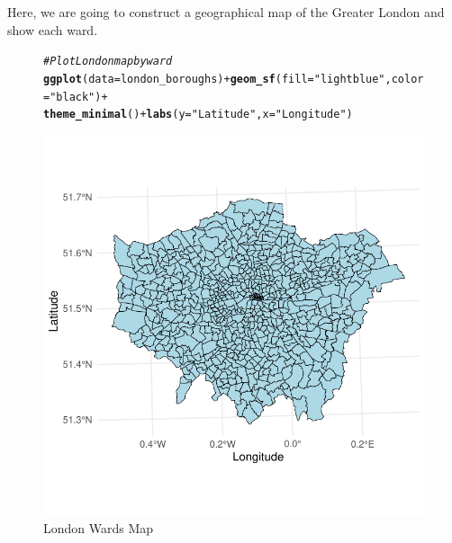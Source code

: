 \documentclass{article}\usepackage[]{graphicx}\usepackage[]{xcolor}
\makeatletter
\def\maxwidth{ %
  \ifdim\Gin@nat@width>\linewidth
    \linewidth
  \else
    \Gin@nat@width
  \fi
}
\newcommand{\hlstr}[1]{\textcolor[rgb]{0.192,0.494,0.8}{#1}}%
\newcommand{\hlcom}[1]{\textcolor[rgb]{0.678,0.584,0.686}{\textit{#1}}}%
\newcommand{\hlopt}[1]{\textcolor[rgb]{0,0,0}{#1}}%
\newcommand{\hlstd}[1]{\textcolor[rgb]{0.345,0.345,0.345}{#1}}%
\newcommand{\hlkwc}[1]{\textcolor[rgb]{0.333,0.667,0.333}{#1}}%
\newcommand{\hlkwd}[1]{\textcolor[rgb]{0.737,0.353,0.396}{\textbf{#1}}}%
\newenvironment{kframe}{%
 \def\at@end@of@kframe{}%
 \ifinner\ifhmode%
  \def\at@end@of@kframe{\end{minipage}}%
  \begin{minipage}{\columnwidth}%
 \fi\fi%
 \def\FrameCommand##1{\hskip\@totalleftmargin \hskip-\fboxsep
 \colorbox{shadecolor}{##1}\hskip-\fboxsep
     \hskip-\linewidth \hskip-\@totalleftmargin \hskip\columnwidth}%
 \MakeFramed {\advance\hsize-\width
   \@totalleftmargin\z@ \linewidth\hsize
   \@setminipage}}%
 {\par\unskip\endMakeFramed%
 \at@end@of@kframe}
\newenvironment{knitrout}{}{} %
\makeatother
\begin{document}
\noindent
Here, we are going to construct a geographical map of the Greater London and show each ward. 

\begingroup
\setlength{\intextsep}{5pt plus 2pt minus 2pt}
\setlength{\textfloatsep}{5pt plus 2pt minus 2pt}
\setlength{\abovecaptionskip}{2pt plus 1pt minus 1pt}
\setlength{\belowcaptionskip}{2pt plus 1pt minus 1pt}

\begin{figure}[H]
\begin{knitrout}\scriptsize
{}\color{fgcolor}\begin{kframe}
\begin{alltt}
\hlcom{# Plot London map by ward}
\hlkwd{ggplot}\hlstd{(}\hlkwc{data} \hlstd{= london_boroughs)} \hlopt{+} \hlkwd{geom_sf}\hlstd{(}\hlkwc{fill} \hlstd{=} \hlstr{"lightblue"}\hlstd{,} \hlkwc{color} \hlstd{=} \hlstr{"black"}\hlstd{)} \hlopt{+}
  \hlkwd{theme_minimal}\hlstd{()} \hlopt{+} \hlkwd{labs}\hlstd{(}\hlkwc{y}\hlstd{=}\hlstr{"Latitude"}\hlstd{,} \hlkwc{x}\hlstd{=}\hlstr{"Longitude"}\hlstd{)}
\end{alltt}
\end{kframe}

{\centering \includegraphics[width=\maxwidth]{figure/beamer-unnamed-chunk-7-1} 

}


\end{knitrout}
\centering
\caption{London Wards Map}
\label{fig:London Wards Map}
\end{figure}
\endgroup
\end{document}
